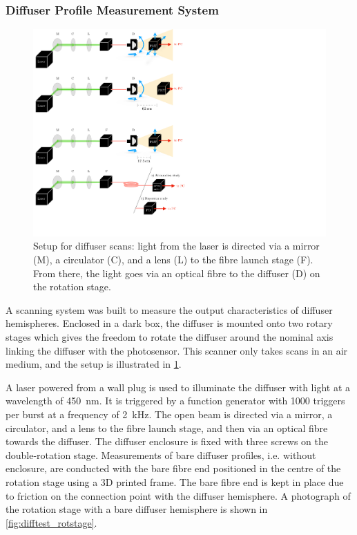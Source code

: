 \documentclass[a4paper,11pt]{article}
\begin{document}
\subsubsection{Diffuser Profile Measurement System}

\begin{figure}[t]
    \centering
    \includegraphics[width=\textwidth]{diffuser_setup_new.pdf}
    \caption{Setup for diffuser scans: light from the laser is directed via a mirror (M), a circulator (C), and a lens (L) to the fibre launch stage (F). From there, the light goes via an optical fibre to the diffuser (D) on the rotation stage.}
    \label{fig:setup}
\end{figure}

A scanning system was built to measure the output characteristics of diffuser hemispheres. Enclosed in a dark box, the diffuser is mounted onto two rotary stages which gives the freedom to rotate the diffuser around the nominal axis linking the diffuser with the photosensor. This scanner only takes scans in an air medium, and the setup is illustrated in \cref{fig:setup}. 

A laser powered from a wall plug is used to illuminate the diffuser with light at  a wavelength of 450~nm. It is triggered by a function generator with 1000 triggers per burst at a frequency of 2~kHz. 
The open beam is directed via a mirror, a circulator, and a lens to the fibre launch stage, and then via an optical fibre towards the diffuser. The diffuser enclosure is fixed with three screws on the double-rotation stage. Measurements of bare diffuser profiles, i.e. without enclosure, are conducted with the bare fibre end positioned in the centre of the rotation stage using a 3D printed frame. The bare fibre end is kept in place due to friction on the connection point with the diffuser hemisphere. A photograph of the rotation stage with a bare diffuser hemisphere is  shown in \cref{fig:difftest_rotstage}.
\end{document}
